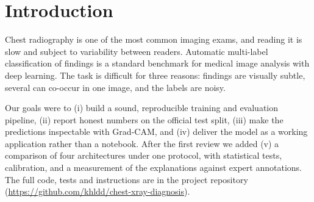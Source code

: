 \documentclass[11pt,a4paper]{article}
\begin{document}
\begin{center}
\end{center}

\section{Introduction}
Chest radiography is one of the most common imaging exams, and reading it is slow and subject to variability between readers. Automatic multi-label classification of findings is a standard benchmark for medical image analysis with deep learning. The task is difficult for three reasons: findings are visually subtle, several can co-occur in one image, and the labels are noisy.

Our goals were to (i) build a sound, reproducible training and evaluation pipeline, (ii) report honest numbers on the official test split, (iii) make the predictions inspectable with Grad-CAM, and (iv) deliver the model as a working application rather than a notebook. After the first review we added (v) a comparison of four architectures under one protocol, with statistical tests, calibration, and a measurement of the explanations against expert annotations. The full code, tests and instructions are in the project repository (\url{https://github.com/khldd/chest-xray-diagnosis}).
\end{document}
